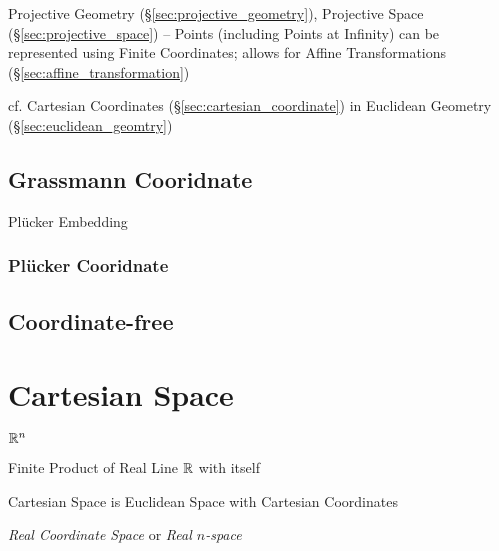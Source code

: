 Projective Geometry (\S\ref{sec:projective_geometry}), Projective
Space (\S\ref{sec:projective_space}) -- Points (including Points at
Infinity) can be represented using Finite Coordinates; allows for
Affine Transformations (\S\ref{sec:affine_transformation})

cf. Cartesian Coordinates (\S\ref{sec:cartesian_coordinate}) in
Euclidean Geometry (\S\ref{sec:euclidean_geomtry})



\subsection{Grassmann Cooridnate}\label{sec:grassmann_coordinate}

Pl\"ucker Embedding



\subsubsection{Pl\"ucker Cooridnate}\label{sec:plucker_coordinate}



\subsection{Coordinate-free}\label{sec:coordinate_free}



\section{Cartesian Space}\label{sec:cartesian_space}

$\mathbb{R}^n$

Finite Product of Real Line $\mathbb{R}$ with itself

Cartesian Space is Euclidean Space with Cartesian Coordinates

\emph{Real Coordinate Space} or \emph{Real $n$-space}



